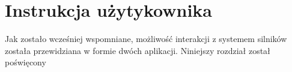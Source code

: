 \clearpage
\section{Instrukcja użytykownika}
\label{sec:manual}

Jak zostało wcześniej wspomniane, możliwość interakcji z systemem silników została przewidziana w formie dwóch aplikacji. Niniejszy rozdział został poświęcony 